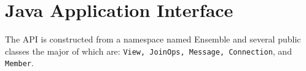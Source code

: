 %
%
%
\section{Java Application Interface}


The API is constructed from a namespace named Ensemble and several
public classes the major of which are: {\tt View, JoinOps, Message,
  Connection}, and {\tt Member}. 

